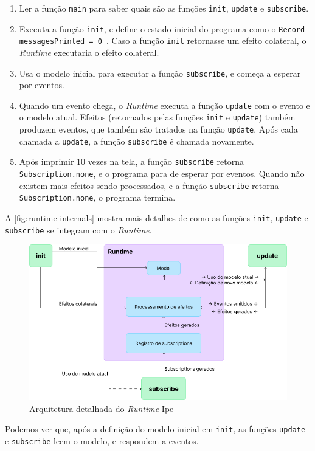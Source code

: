 \begin{enumerate}
    \item Ler a função \texttt{main} para saber quais são as funções \texttt{init},
          \texttt{update} e \texttt{subscribe}.
    \item Executa a função \texttt{init}, e define o estado inicial do programa
          como o \texttt{Record} \texttt{{ messagesPrinted = 0 }}. Caso a função \texttt{init}
          retornasse um efeito colateral, o \textit{Runtime} executaria o efeito colateral.
    \item Usa o modelo inicial para executar a função \texttt{subscribe}, e
          começa a esperar por eventos.
    \item Quando um evento chega, o \textit{Runtime} executa a função \texttt{update}
          com o evento e o modelo atual. Efeitos (retornados pelas funções \texttt{init}
          e \texttt{update}) também produzem eventos, que também são tratados na função
          \texttt{update}. Após cada chamada a \texttt{update}, a função \texttt{subscribe}
          é chamada novamente.
    \item Após imprimir 10 vezes na tela, a função \texttt{subscribe} retorna
          \texttt{Subscription.none}, e o programa para de esperar por eventos.
          Quando não existem mais efeitos sendo processados, e a função \texttt{subscribe}
          retorna \texttt{Subscription.none}, o programa termina.
\end{enumerate}

A \autoref{fig:runtime-internals} mostra mais detalhes de como as funções \texttt{init},
\texttt{update} e \texttt{subscribe} se integram com o \textit{Runtime}.

\begin{figure}[htb]
    \caption{Arquitetura detalhada do \textit{Runtime} Ipe}
    \label{fig:runtime-internals}
    \begin{center}
        \includegraphics[scale=0.5]{pictures/runtime-internals.png}
    \end{center}
\end{figure}

Podemos ver que, após a definição do modelo inicial em \texttt{init}, as funções
\texttt{update} e \texttt{subscribe} leem o modelo, e respondem a eventos.
